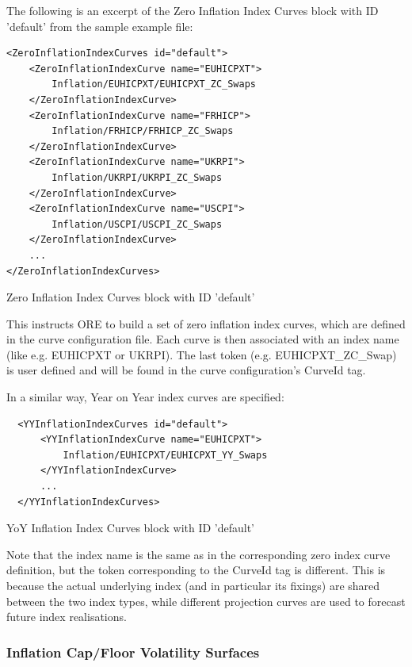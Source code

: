 \documentclass[12pt, a4paper]{article}
\begin{document}
{The following is an excerpt of the Zero Inflation Index Curves block with ID 'default' from the sample example file:

\begin{listing}[H]
\begin{verbatim}
<ZeroInflationIndexCurves id="default">
    <ZeroInflationIndexCurve name="EUHICPXT">
        Inflation/EUHICPXT/EUHICPXT_ZC_Swaps
    </ZeroInflationIndexCurve>
    <ZeroInflationIndexCurve name="FRHICP">
        Inflation/FRHICP/FRHICP_ZC_Swaps
    </ZeroInflationIndexCurve>
    <ZeroInflationIndexCurve name="UKRPI">
        Inflation/UKRPI/UKRPI_ZC_Swaps
    </ZeroInflationIndexCurve>
    <ZeroInflationIndexCurve name="USCPI">
        Inflation/USCPI/USCPI_ZC_Swaps
    </ZeroInflationIndexCurve>
    ...
</ZeroInflationIndexCurves>
\end{verbatim}
\caption{Zero Inflation Index Curves block with ID 'default'}
\label{lst:zeroinflationindexcurve_spec}
\end{listing}

This instructs ORE to build a set of zero inflation index curves, which are defined in the curve configuration
file. Each curve is then associated with an index name (like e.g. EUHICPXT or UKRPI). The last token
(e.g. EUHICPXT\_ZC\_Swap) is user defined and will be found in the curve configuration's CurveId tag.

In a similar way, Year on Year index curves are specified:

\begin{listing}[H]
\begin{verbatim}
  <YYInflationIndexCurves id="default">
      <YYInflationIndexCurve name="EUHICPXT">
          Inflation/EUHICPXT/EUHICPXT_YY_Swaps
      </YYInflationIndexCurve>
      ...
  </YYInflationIndexCurves>
\end{verbatim}
\caption{YoY Inflation Index Curves block with ID 'default'}
\label{lst:yoyinflationindexcurve_spec}
\end{listing}

Note that the index name is the same as in the corresponding zero index curve definition, but the token corresponding to
the CurveId tag is different. This is because the actual underlying index (and in particular its fixings) are shared
between the two index types, while different projection curves are used to forecast future index realisations.

\subsubsection{Inflation Cap/Floor Volatility Surfaces}

}
\end{document}
